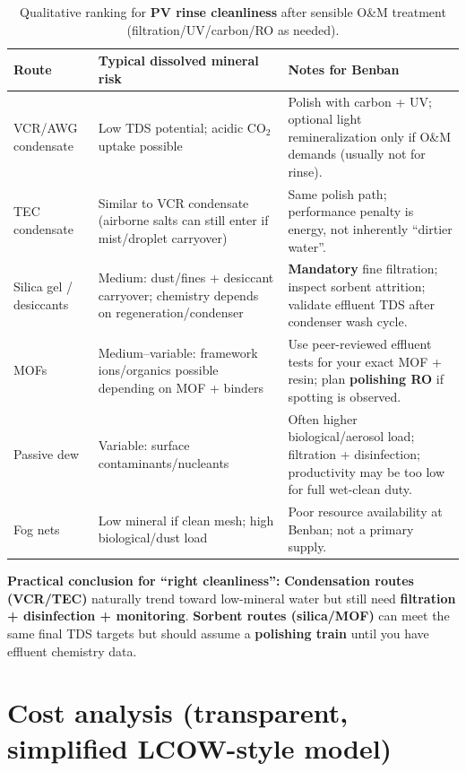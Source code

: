 \documentclass[11pt,a4paper]{article}
\begin{document}
\begin{table}[h]
\centering
\small
\caption{Qualitative ranking for \textbf{PV rinse cleanliness} after sensible O\&M treatment (filtration/UV/carbon/RO as needed).}
\begin{tabular}{@{}p{3.4cm}p{4.6cm}p{6.4cm}@{}}
\toprule
\textbf{Route} & \textbf{Typical dissolved mineral risk} & \textbf{Notes for Benban} \\
\midrule
VCR/AWG condensate & Low TDS potential; acidic CO$_2$ uptake possible &
Polish with carbon + UV; optional light remineralization only if O\&M demands (usually not for rinse). \\
TEC condensate & Similar to VCR condensate (airborne salts can still enter if mist/droplet carryover) &
Same polish path; performance penalty is energy, not inherently ``dirtier water''. \\
Silica gel / desiccants & Medium: dust/fines + desiccant carryover; chemistry depends on regeneration/condenser &
\textbf{Mandatory} fine filtration; inspect sorbent attrition; validate effluent TDS after condenser wash cycle. \\
MOFs & Medium--variable: framework ions/organics possible depending on MOF + binders &
Use peer-reviewed effluent tests for your exact MOF + resin; plan \textbf{polishing RO} if spotting is observed. \\
Passive dew & Variable: surface contaminants/nucleants &
Often higher biological/aerosol load; filtration + disinfection; productivity may be too low for full wet-clean duty. \\
Fog nets & Low mineral if clean mesh; high biological/dust load &
Poor resource availability at Benban; not a primary supply. \\
\bottomrule
\end{tabular}
\end{table}

\noindent\textbf{Practical conclusion for ``right cleanliness'':} \textbf{Condensation routes (VCR/TEC)} naturally trend toward low-mineral water but still need \textbf{filtration + disinfection + monitoring}. \textbf{Sorbent routes (silica/MOF)} can meet the same final TDS targets but should assume a \textbf{polishing train} until you have effluent chemistry data.

\section{Cost analysis (transparent, simplified LCOW-style model)}
\end{document}
